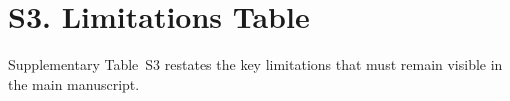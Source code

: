 \section{S3. Limitations Table}

Supplementary Table~S3 restates the key limitations that must remain visible in the main manuscript.



